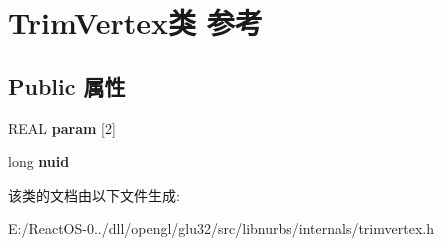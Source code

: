 \hypertarget{class_trim_vertex}{}\section{Trim\+Vertex类 参考}
\label{class_trim_vertex}
\subsection*{Public 属性}
\begin{DoxyCompactItemize}
\item 
\mbox{\label{class_trim_vertex_a6affbed5011f055bcf822b83ff62e509}} 
R\+E\+AL {\bfseries param} \mbox{[}2\mbox{]}
\item 
\mbox{\label{class_trim_vertex_ae5f2d8846d7a73234d03b7244605d01f}} 
long {\bfseries nuid}
\end{DoxyCompactItemize}


该类的文档由以下文件生成\+:\begin{DoxyCompactItemize}
\item 
E\+:/\+React\+O\+S-\/0../dll/opengl/glu32/src/libnurbs/internals/trimvertex.\+h\end{DoxyCompactItemize}
